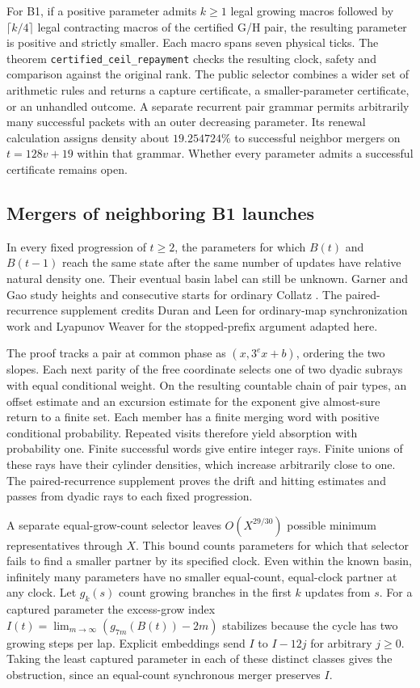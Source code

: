 For B1, if a positive parameter
admits $k\ge1$ legal growing macros followed by $\lceil k/4\rceil$
legal contracting macros of the certified G/H pair, the resulting
parameter is positive and strictly smaller. Each macro spans seven
physical ticks. The theorem \texttt{certified\_ceil\_repayment} checks
the resulting clock, safety and comparison against the original rank.
The public selector combines a wider set of arithmetic rules and
returns a capture certificate, a smaller-parameter certificate, or an
unhandled outcome. A separate recurrent pair grammar permits arbitrarily
many successful packets with an outer decreasing parameter. Its renewal
calculation assigns density about $19.254724\%$ to successful neighbor
mergers on $t=128v+19$ within that grammar. Whether every parameter admits a successful certificate remains open.

\subsection{Mergers of neighboring B1 launches}
\label{sec:pair-coalescence}

In every fixed progression of $t\ge2$, the parameters for which
$B(t)$ and $B(t-1)$ reach the same state after the same number of
updates have relative natural density one. Their eventual basin label
can still be unknown. Garner and Gao study heights and consecutive
starts for ordinary Collatz \cite{garner-heights,gao-heights}. The
paired-recurrence supplement credits Duran and Leen for ordinary-map
synchronization work and Lyapunov Weaver for the stopped-prefix
argument adapted here.

The proof tracks a pair at common phase as
$(x,3^e x+b)$, ordering the two slopes. Each next parity of the free
coordinate selects one of two dyadic subrays with equal conditional
weight. On the resulting countable chain of pair types, an offset estimate
and an excursion estimate for the exponent give almost-sure return to a
finite set. Each member has a finite merging word with positive
conditional probability. Repeated visits therefore yield absorption
with probability one. Finite successful words give entire integer rays.
Finite unions of these rays have their cylinder densities, which increase
arbitrarily close to one. The paired-recurrence supplement proves the drift and hitting estimates
and passes from dyadic rays to each fixed progression.

A separate equal-grow-count selector leaves $O(X^{29/30})$ possible
minimum representatives through $X$. This bound counts parameters for
which that selector fails to find a smaller partner by its specified
clock. Even within the known basin, infinitely many parameters have
no smaller equal-count, equal-clock partner at any clock. Let $g_k(s)$ count growing branches in the first $k$ updates from $s$.
For a captured parameter the excess-grow index
$I(t)=\lim_{m\to\infty}(g_{7m}(B(t))-2m)$ stabilizes because the cycle
has two growing steps per lap. Explicit embeddings send $I$ to
$I-12j$ for arbitrary $j\ge0$. Taking the least captured parameter in
each of these distinct classes gives the obstruction, since an
equal-count synchronous merger preserves $I$.

